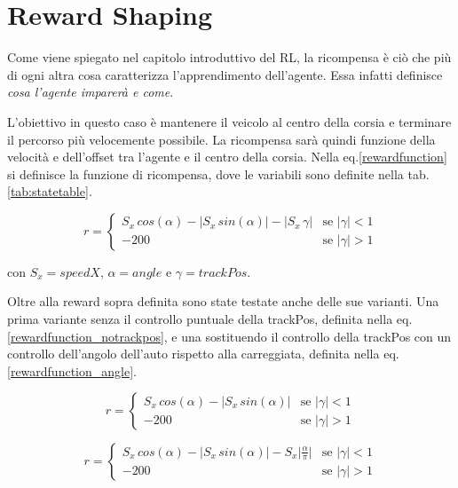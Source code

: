 \clearpage

\section{Reward Shaping}

Come viene spiegato nel capitolo introduttivo del RL, la ricompensa è ciò che più di ogni altra cosa caratterizza l'apprendimento dell'agente. Essa infatti definisce \textit{cosa l'agente imparerà e come}.
\newline

L'obiettivo in questo caso è mantenere il veicolo al centro della corsia e terminare il percorso più velocemente possibile. La ricompensa sarà quindi funzione della velocità e dell'offset tra l'agente e il centro della corsia. Nella eq.\ref{rewardfunction} si definisce la funzione di ricompensa, dove le variabili sono definite nella tab. \ref{tab:statetable}.

\begin{equation}\label{rewardfunction}
r =
\begin{cases}
   S_x \, cos(\alpha) - |S_x \, sin(\alpha)| - |S_x \, \gamma| & \text{se } |\gamma|<1\\
   -200                                                        & \text{se } |\gamma|>1
\end{cases}
\end{equation}

con $S_x=speedX$, $\alpha=angle$ e $\gamma=trackPos$.
\newline

Oltre alla reward sopra definita sono state testate anche delle sue varianti. Una prima variante senza il controllo puntuale della trackPos, definita nella eq.\ref{rewardfunction_notrackpos}, e una sostituendo il controllo della trackPos con un controllo dell'angolo dell'auto rispetto alla carreggiata, definita nella eq.\ref{rewardfunction_angle}.

\begin{equation}\label{rewardfunction_notrackpos}
r =
\begin{cases}
   S_x \, cos(\alpha) - |S_x \, sin(\alpha)| & \text{se } |\gamma|<1\\
   -200                                      & \text{se } |\gamma|>1
\end{cases}
\end{equation}

\begin{equation}\label{rewardfunction_angle}
r =
\begin{cases}
   S_x \, cos(\alpha) - |S_x \, sin(\alpha)| - S_x\big|\frac{\alpha}{\pi}\big| & \text{se } |\gamma|<1\\
   -200                                                                        & \text{se } |\gamma|>1
\end{cases}
\end{equation}

